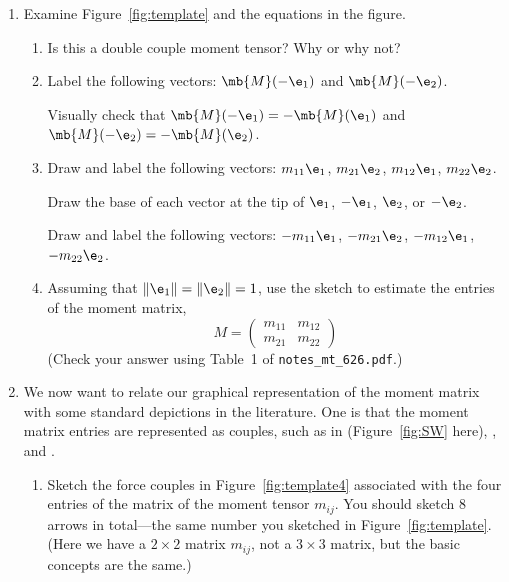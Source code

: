 \documentclass[11pt,titlepage,fleqn]{article}
\newcommand{\mtfile}{\texttt{notes\_mt\_626.pdf}}
\begin{document}
\begin{enumerate}

\item Examine Figure~\ref{fig:template} and the equations in the figure.
\label{prob:bigvec}

\begin{enumerate}
\item Is this a double couple moment tensor? Why or why not?

\item Label the following vectors: $\mb{M}(-\e_1)$ and $\mb{M}(-\e_2)$.

Visually check that $\mb{M}(-\e_1) = -\mb{M}(\e_1)$ and $\mb{M}(-\e_2) = -\mb{M}(\e_2)$.

\item Draw and label the following vectors: $m_{11}\e_1$, $m_{21}\e_2$, $m_{12}\e_1$, $m_{22}\e_2$.

Draw the base of each vector at the tip of $\e_1$, $-\e_1$, $\e_2$, or $-\e_2$.

Draw and label the following vectors: $-m_{11}\e_1$, $-m_{21}\e_2$, $-m_{12}\e_1$, $-m_{22}\e_2$.

\item Assuming that $\|\e_1\| = \|\e_2\| = 1$, use the sketch to estimate the entries of the moment matrix,
%
\begin{equation*}
M = \begin{pmatrix} m_{11} & m_{12} \\ m_{21} & m_{22} \end{pmatrix}
\end{equation*}
%
(Check your answer using Table~1 of \mtfile.)

\end{enumerate}


\item 
\label{prob:matrix}
We now want to relate our graphical representation of the moment matrix with some standard depictions in the literature. One is that the moment matrix entries are represented as couples, such as in \citet[][Figure 4.4-4]{SteinWysession} (Figure~\ref{fig:SW} here), \citet[][Figure~9.2]{ShearerE2}, and \citet[][Figure 3.7]{AkiRichardsE2}.
%
\begin{enumerate}
\item Sketch the force couples in Figure~\ref{fig:template4} associated with the four entries of the matrix of the moment tensor $m_{ij}$. You should sketch 8 arrows in total---the same number you sketched in Figure~\ref{fig:template}.
(Here we have a $2 \times 2$ matrix $m_{ij}$, not a $3 \times 3$ matrix, but the basic concepts are the same.)


\end{enumerate}
\end{enumerate}
\end{document}
